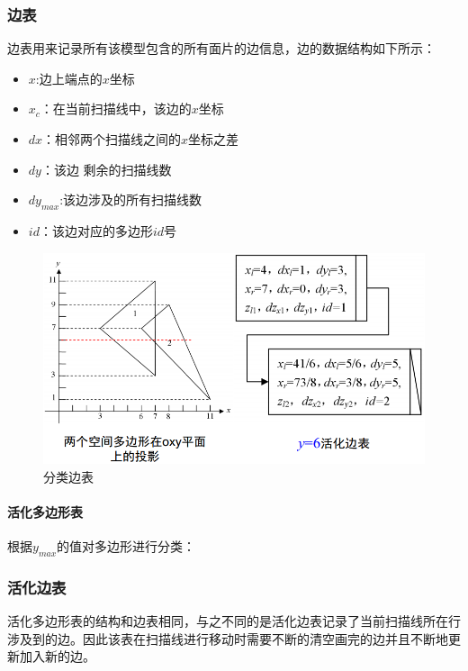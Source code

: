 \documentclass[10pt]{article}
\begin{document}
\subsubsection{边表}
边表用来记录所有该模型包含的所有面片的边信息，边的数据结构如下所示：
\begin{itemize}
\item{$x$:边上端点的$x$坐标}
\item{$x_c$：在当前扫描线中，该边的$x$坐标}
\item{$dx$：相邻两个扫描线之间的$x$坐标之差}
\item{$dy$：该边{\color{red} 剩余的}扫描线数}
\item{$dy_{max}$:该边涉及的所有扫描线数}
\item{$id$：该边对应的多边形$id$号}
\end{itemize}
\begin{figure}[H]
\setlength{\abovecaptionskip}{2pt}
\begin{center}
\includegraphics[scale=0.4]{structure2.png}
\end{center}
\caption{分类边表}
\end{figure}

\paragraph{活化多边形表}
根据$y_{max}$的值对多边形进行分类：
\subsubsection{活化边表}
活化多边形表的结构和边表相同，与之不同的是活化边表记录了当前扫描线所在行涉及到的边。因此该表在扫描线进行移动时需要不断的清空画完的边并且不断地更新加入新的边。
\end{document}
